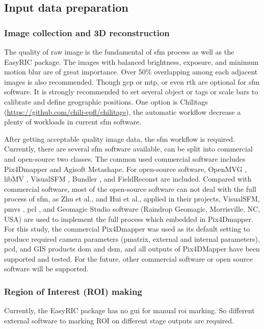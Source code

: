 \documentclass{configs/bmcart}
\begin{document}
\subsection*{Input data preparation}

\subsubsection*{Image collection and 3D reconstruction}
The quality of raw image is the fundamental of \acrfull*{sfm} process as well as the EasyRIC package. The images with balanced brightness, exposure, and minimum motion blur are of great importance. Over 50\% overlapping among each adjacent images is also recommended. Though \acrfull*{gcp} or \acrfull*{mtp}, or even \acrfull*{rtk} are optional for \acrshort*{sfm} software. It is strongly recommended to set several object or tags or scale bars to calibrate and define geographic positions. One option is Chilitags (\url{https://github.com/chili-epfl/chilitags}), the automatic workflow decrease a plenty of workloads in current \acrshort*{sfm} software.

After getting acceptable quality image data, the \acrshort*{sfm} workflow is required. Currently, there are several \acrshort*{sfm} software available, can be split into commercial and open-source two classes. The common used commercial software includes Pix4Dmapper and Agisoft Metashape. For open-source software, OpenMVG \cite{openmvg_openmvg_2020}, libMV \cite{mierle_libmv_2020}, VisualSFM \cite{wu_visualsfm_2020}, Bundler \cite{snavely_bundler_2020}, and FieldReconst \cite{naro_fieldreconst_2020} are included. Compared with commercial software, most of the open-source software can not deal with the full process of \acrshort*{sfm}, as Zhu et al., \cite{zhu_quantification_2020} and Hui et al., \cite{hui_image-based_2018} applied in their projects, VisualSFM, \acrfull*{pmvs} \cite{furukawa_accurate_2010}, \acrfull*{pcl} \cite{rusu_3d_2011}, and Geomagic Studio software (Raindrop Geomagic, Morrisville, NC, USA) are used to implement the full process which embedded in Pix4Dmapper. For this study, the commercial Pix4Dmapper was used as its default setting to produce required camera parameters (pmatrix, external and internal parameters), \acrfull*{pcd}, and GIS products \acrfull*{dom} and \acrfull*{dsm}, and all outputs of Pix4DMapper have been supported and tested. For the future, other commercial software or open source software will be supported.

\subsubsection*{Region of Interest (ROI) making}
Currently, the EasyRIC package has no \acrfull*{gui} for manual \acrfull*{roi} marking. So different external software to marking ROI on different stage outputs are required.
\end{document}
